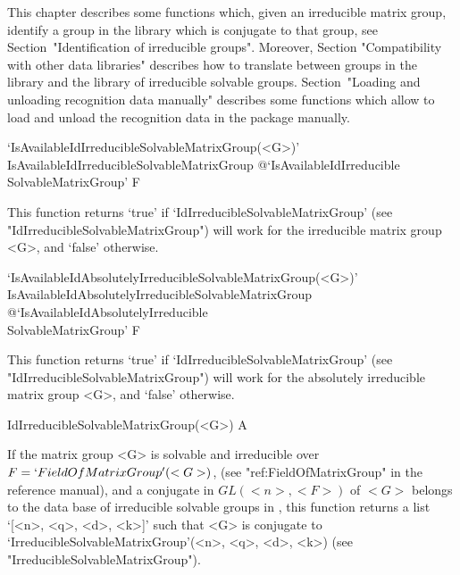 


This chapter describes some functions which, given an irreducible matrix 
group, identify a group in the {\IRREDSOL} library which is conjugate
to that group, see Section~"Identification of irreducible groups".
Moreover,  Section "Compatibility with other data libraries" describes
how to  translate between groups in the {\IRREDSOL} library and the
{\GAP}  library of irreducible solvable groups. 
Section~"Loading and unloading recognition data manually" describes some 
functions which allow to load and unload the recognition data in the 
{\IRREDSOL} package manually.


\>`IsAvailableIdIrreducibleSolvableMatrixGroup(<G>)'%
{IsAvailableIdIrreducibleSolvableMatrixGroup}%
@{`IsAvailableIdIrreducible\\SolvableMatrixGroup'} F

This function returns `true' if `IdIrreducibleSolvableMatrixGroup' (see
"IdIrreducibleSolvableMatrixGroup") will work for the irreducible matrix group <G>, and `false' otherwise.

\>`IsAvailableIdAbsolutelyIrreducibleSolvableMatrixGroup(<G>)'%
{IsAvailableIdAbsolutelyIrreducibleSolvableMatrixGroup}%
@{`IsAvailableIdAbsolutelyIrreducible\\SolvableMatrixGroup'} F

This function returns `true' if `IdIrreducibleSolvableMatrixGroup' (see
"IdIrreducibleSolvableMatrixGroup") will work for the absolutely irreducible matrix group <G>, and `false' otherwise.


\>IdIrreducibleSolvableMatrixGroup(<G>) A

If the matrix group <G> is solvable and irreducible over $F
= `FieldOfMatrixGroup'(<G>)$, (see "ref:FieldOfMatrixGroup" in the {\GAP} reference manual), and a conjugate in
$GL(<n>, <F>)$ of $<G>$ belongs to the data base of  irreducible solvable groups in
{\IRREDSOL}, this function returns a list `[<n>, <q>, <d>, <k>]' such that <G> is
conjugate to  `IrreducibleSolvableMatrixGroup'(<n>, <q>, <d>, <k>) (see
"IrreducibleSolvableMatrixGroup").

